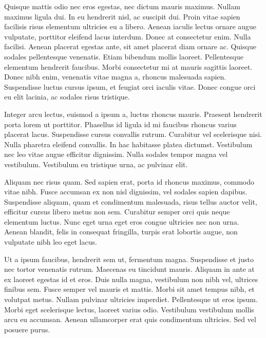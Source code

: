 Quisque mattis odio nec eros egestas, nec dictum mauris maximus. Nullam maximus
ligula dui. In eu hendrerit nisl, ac suscipit dui. Proin vitae sapien facilisis
risus elementum ultricies eu a libero. Aenean iaculis lectus ornare augue
vulputate, porttitor eleifend lacus interdum. Donec at consectetur enim. Nulla
facilisi. Aenean placerat egestas ante, sit amet placerat diam ornare ac.
Quisque sodales pellentesque venenatis. Etiam bibendum mollis laoreet.
Pellentesque elementum hendrerit faucibus. Morbi consectetur mi at mauris
sagittis laoreet. Donec nibh enim, venenatis vitae magna a, rhoncus malesuada
sapien. Suspendisse luctus cursus ipsum, et feugiat orci iaculis vitae. Donec
congue orci eu elit lacinia, ac sodales risus tristique.

Integer arcu lectus, euismod a ipsum a, luctus rhoncus mauris. Praesent
hendrerit porta lorem ut porttitor. Phasellus id ligula id mi faucibus rhoncus
varius placerat lacus. Suspendisse cursus convallis rutrum. Curabitur vel
scelerisque nisi. Nulla pharetra eleifend convallis. In hac habitasse platea
dictumst. Vestibulum nec leo vitae augue efficitur dignissim. Nulla sodales
tempor magna vel vestibulum. Vestibulum eu tristique urna, ac pulvinar elit.

Aliquam nec risus quam. Sed sapien erat, porta id rhoncus maximus, commodo
vitae nibh. Fusce accumsan ex non nisl dignissim, vel sodales sapien dapibus.
Suspendisse aliquam, quam et condimentum malesuada, risus tellus auctor velit,
efficitur cursus libero metus non sem. Curabitur semper orci quis neque
elementum luctus. Nunc eget urna eget eros congue ultricies nec non urna.
Aenean blandit, felis in consequat fringilla, turpis erat lobortis augue, non
vulputate nibh leo eget lacus.

Ut a ipsum faucibus, hendrerit sem ut, fermentum magna. Suspendisse et justo
nec tortor venenatis rutrum. Maecenas eu tincidunt mauris. Aliquam in ante at
ex laoreet egestas id et eros. Duis nulla magna, vestibulum non nibh vel,
ultrices finibus sem. Fusce semper vel mauris et mattis. Morbi sit amet tempus
nibh, et volutpat metus. Nullam pulvinar ultricies imperdiet. Pellentesque ut
eros ipsum. Morbi eget scelerisque lectus, laoreet varius odio. Vestibulum
vestibulum mollis arcu eu accumsan. Aenean ullamcorper erat quis condimentum
ultricies. Sed vel posuere purus.

